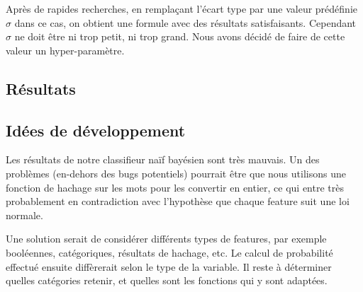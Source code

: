 \documentclass[french, 14pt]{memoir}
\begin{document}
Après de rapides recherches, en remplaçant l'écart type par une valeur prédéfinie $\sigma$ dans ce cas, on obtient une formule avec des résultats satisfaisants. Cependant $\sigma$ ne doit être ni trop petit, ni trop grand. Nous avons décidé de faire de cette valeur un hyper-paramètre.


\subsection{Résultats}


\subsection{Idées de développement}

Les résultats de notre classifieur naïf bayésien sont très mauvais. Un des problèmes (en-dehors des bugs potentiels) pourrait être que nous utilisons une fonction de hachage sur les mots pour les convertir en entier, ce qui entre très probablement en contradiction avec l'hypothèse que chaque feature suit une loi normale.

Une solution serait de considérer différents types de features, par exemple booléennes, catégoriques, résultats de hachage, etc. Le calcul de probabilité effectué ensuite diffèrerait selon le type de la variable. Il reste à déterminer quelles catégories retenir, et quelles sont les fonctions qui y sont adaptées.
\end{document}
